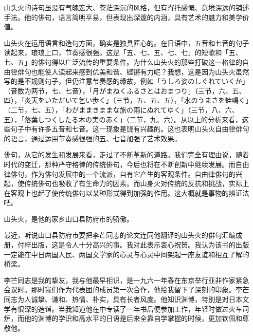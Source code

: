 {

山头火的诗句虽没有气魄宏大、苍茫深沉的风格，但有寄托感慨、意境深远的铺述手法。他的俳句，语言简明平易，但表现出深邃的内涵，具有艺术的魅力和美学价值。

山头火在运用语言和造句方面，确实是独具匠心的。在日语中，五音和七音的句子读起来，琅琅上口，节奏感很强。这是「五、七、五、七、七」的短歌和「五、七、五」的俳句得以广泛流传的重要条件。为什么山头火的那些打破这一格律的自由律俳句也能使人读起来感到优美和谐、铿锵有力呢？我想，这是因为山头火虽然写的是不规则句子，但仍注意节奏感的缘故，例如「{\FM うしろ姿のしぐれていくか}」（音数为两节，七、七音），「{\FM 月がまねくふるさとはおまつり}」（三节，六、五、四），「{\FM 炎天をいただいて乞い歩く}」（三节，五、五、五），「{\FM 水のうまさを蛙鳴く}」（二节，七、五），「{\FM わがままきままな旅の雨にぬれてゆく}」（三节，八、六、五），「{\FM 落葉しつくしたる木の実の赤く}」（二节，九、六）。从以上的分析来看，这些句子中有许多五音和七音。这一现象是饶有兴趣的。这也表明山头火自由律俳句的语言，通过运用节奏感很强的五、七音加强了艺术效果。

俳句，从它的发生和发展来看，走过了不断革新的道路。我们完全有理由说，随着时代的变迁，那种严守格律的传统俳句，今后也将在不断创新中继续发展。而自由律俳句，作为俳句发展中的一个流派，自有它产生的客观条件。自由律俳句的兴起，使传统俳句也吸收了有生命力的因素。而山身火对传统的反抗和挑战，实际上在客观上也起了使传统俳句以某种形式得到加强的作用。这大概就是事物的辨证法吧。

山头火，是他的家乡山口县防府市的骄傲。

最近，听说山口县防府市要把李芒同志的论文连同他翻译的山头火的俳句汇编成册，付梓出版，这是令人十分高兴的事。我对此表示衷心祝贺。我认为该书的出版一定能在中日两国人民、两国文学家的心灵与心灵中间架起一座友谊和相互了解的桥梁。

李芒同志是我的挚友，我与他最早相识，是一九六一年春在东京举行亚非作家紧急会议时。那时我们作为代表团的成员第一次合作，他给我留下了深刻的印象。李芒同志为人诚挚、谦和、热情、朴实，具有长者风度。他知识渊博，特别是对日本文学有很深的造诣。当我知道他在中专读了一年书后便参加工作，年轻时做过火车司炉，而他的渊博的学识和高水平的日语是后来全靠自学掌握的时候，更加钦佩和尊敬他。

}
